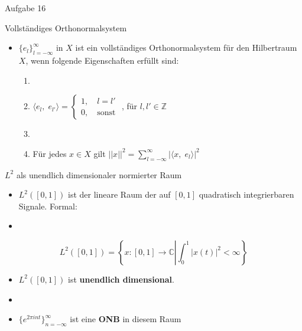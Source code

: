 \documentclass[14pt, aspectratio=169, handout]{beamer}
\begin{document}
\begin{frame}{Aufgabe 16}
    
\end{frame}

\begin{frame}{Vollständiges Orthonormalsystem}
    \begin{itemize}
        \item $\{e_l\}_{l = -\infty}^\infty$ in $X$ ist ein vollständiges Orthonormalsystem für den Hilbertraum $X$, wenn folgende Eigenschaften erfüllt sind:
        \begin{enumerate}
            \item[]
            \item $\langle e_l, \; e_{l'} \rangle = \begin{cases}
                1, \hspace{12pt} l = l' \\
                0, \hspace{12pt} \text{sonst}
            \end{cases}$ \hspace{12pt}, für $l,l' \in \mathbb{Z}$
            \item[] 
            \item Für jedes $x\in X$ gilt $||x||^2 = \displaystyle\sum_{l=-\infty}^\infty |\langle x, \; e_l \rangle|^2$
        \end{enumerate}
    \end{itemize}
\end{frame}

\begin{frame}{$L^2$ als unendlich dimensionaler normierter Raum}
    \begin{itemize}
        \item $L^2([0,1])$ ist der lineare Raum der auf $[0,1]$ quadratisch integrierbaren Signale. Formal:
        \item[] 
    \end{itemize}
    $$L^2\left( [0,1] \right) = \left\{ x: [0,1] \to \mathbb{C} \left| \int_0^1 |x(t)|^2 < \infty \right. \right\}$$
    \begin{itemize}
        \item $L^2([0,1])$ ist \textbf{unendlich dimensional}.
        \item[] 
        \item $\{e^{2 \pi i n t}\}_{n = -\infty}^\infty$ ist eine \textbf{ONB} in diesem Raum
    \end{itemize}
\end{frame}
\end{document}
